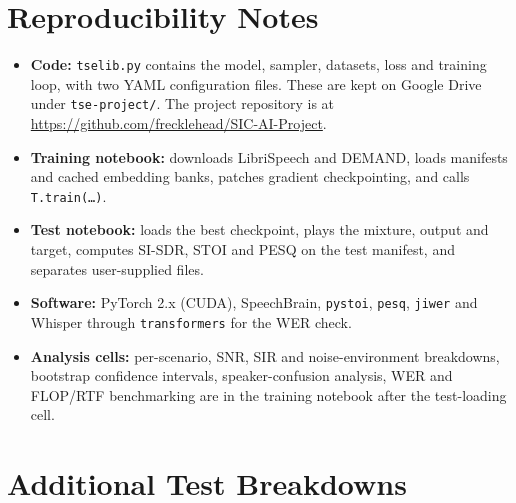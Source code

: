 \documentclass[11pt,a4paper]{article}
\newcommand{\sisdr}{SI-SDR}
\begin{document}

\setlength{\bibsep}{2pt}


\appendix

\section{Reproducibility Notes}
\label{app:repro}
\begin{itemize}
  \item \textbf{Code:} \texttt{tselib.py} contains the model, sampler, datasets, loss and training
        loop, with two YAML configuration files. These are kept on Google Drive under
        \texttt{tse-project/}. The project repository is at
        \url{https://github.com/frecklehead/SIC-AI-Project}.
  \item \textbf{Training notebook:} downloads LibriSpeech and DEMAND, loads manifests and cached
        embedding banks, patches gradient checkpointing, and calls \texttt{T.train(\ldots)}.
  \item \textbf{Test notebook:} loads the best checkpoint, plays the mixture, output and target,
        computes \sisdr, STOI and PESQ on the test manifest, and separates user-supplied files.
  \item \textbf{Software:} PyTorch 2.x (CUDA), SpeechBrain, \texttt{pystoi}, \texttt{pesq},
        \texttt{jiwer} and Whisper through \texttt{transformers} for the WER check.
  \item \textbf{Analysis cells:} per-scenario, SNR, SIR and noise-environment breakdowns, bootstrap
        confidence intervals, speaker-confusion analysis, WER and FLOP/RTF benchmarking are in the
        training notebook after the test-loading cell.
\end{itemize}

\section{Additional Test Breakdowns}
\label{app:breakdowns}
\end{document}
